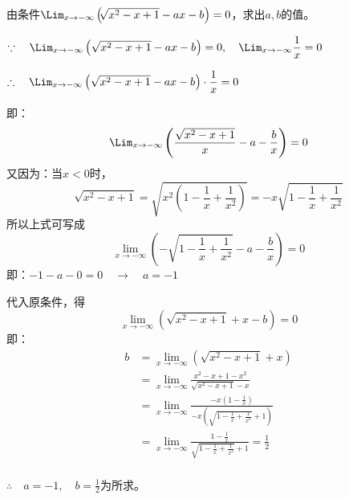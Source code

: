 \begin{example}
由条件$\Lim_{x\to -\infty}\left(\sqrt[]{x^2-x+1}-ax-b\right)=0$，求出$a,b$的值。
\end{example}

\begin{solution}
$\because\quad \Lim_{x\to -\infty}\left(\sqrt{x^2-x+1}-ax-b\right)=0,\quad \Lim_{x\to -\infty}\frac{1}{x}=0$

$\therefore\quad \Lim_{x\to -\infty}\left(\sqrt{x^2-x+1}-ax-b\right)\cdot \frac{1}{x}=0$

即：
\[\Lim_{x\to -\infty}\left(\frac{\sqrt{x^2-x+1}}{x}-a-\frac{b}{x}\right)=0\]
又因为：当$x<0$时，
\[\sqrt{x^2-x+1}=\sqrt{x^2\left(1-\frac{1}{x}+\frac{1}{x^2}\right)}=-x\sqrt{1-\frac{1}{x}+\frac{1}{x^2}}\]
所以上式可写成
\[\lim_{x\to -\infty}\left(-\sqrt{1-\frac{1}{x}+\frac{1}{x^2}}-a-\frac{b}{x}\right)=0\]
即：$-1-a-0=0\quad \to \quad a=-1$

代入原条件，得
\[\lim_{x\to -\infty}\left(\sqrt{x^2-x+1}+x-b\right)=0\]
即：
\[\begin{split}
    b&=\lim_{x\to-\infty}\left(\sqrt{x^2-x+1}+x\right)\\
    &=\lim_{x\to-\infty} \frac{x^2-x+1-x^2}{\sqrt{x^2-x+1}-x}  \\
    &=\lim_{x\to-\infty}\frac{-x\left(1-\frac{1}{x}\right)}{-x\left(\sqrt{1-\frac{1}{x}+\frac{1}{x^2}}+1\right)}    \\
    &=\lim_{x\to-\infty}\frac{1-\frac{1}{x}}{\sqrt{1-\frac{1}{x}+\frac{1}{x^2}}+1} =\frac{1}{2}   \\
\end{split}\]

$\therefore\quad a=-1,\quad b=\frac{1}{2}$为所求。
\end{solution}

